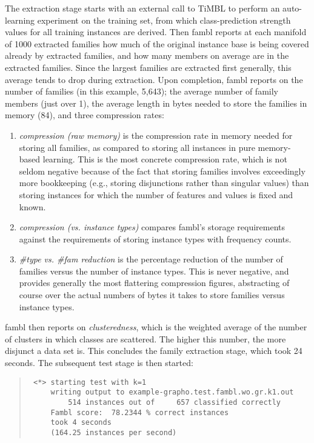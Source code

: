 \documentclass[11pt]{article}
\begin{document}
The extraction stage starts with an external call to TiMBL to perform
an auto-learning experiment on the training set, from which
class-prediction strength values for all training instances are
derived. Then {\sc fambl} reports at each manifold of 1000 extracted
families how much of the original instance base is being covered
already by extracted families, and how many members on average are in
the extracted families. Since the largest families are extracted first
generally, this average tends to drop during extraction. Upon
completion, {\sc fambl} reports on the number of families (in this
example, 5,643); the average number of family members (just over 1),
the average length in bytes needed to store the families in memory
(84), and three compression rates:
\begin{enumerate}
\item
{\em compression (raw memory)} is the compression rate in memory
needed for storing all families, as compared to storing all instances
in pure memory-based learning. This is the most concrete compression
rate, which is not seldom negative because of the fact that storing
families involves exceedingly more bookkeeping (e.g., storing
disjunctions rather than singular values) than storing instances for
which the number of features and values is fixed and known.
\item
{\em compression (vs. instance types)} compares {\sc fambl}'s storage
requirements against the requirements of storing instance types with
frequency counts.
\item
{\em \#type vs. \#fam reduction} is the percentage reduction of the
number of families versus the number of instance types. This is never
negative, and provides generally the most flattering compression
figures, abstracting of course over the actual numbers of bytes it
takes to store families versus instance types.
\end{enumerate}
{\sc fambl} then reports on {\em clusteredness}, which is the weighted
average of the number of clusters in which classes are scattered. The
higher this number, the more disjunct a data set is. This concludes
the family extraction stage, which took 24 seconds. The subsequent test
stage is then started:

\begin{quote}
{\tiny
\begin{verbatim}
 <*> starting test with k=1
     writing output to example-grapho.test.fambl.wo.gr.k1.out
         514 instances out of     657 classified correctly
     Fambl score:  78.2344 % correct instances
     took 4 seconds
     (164.25 instances per second)
\end{verbatim}
}
\end{quote}
\end{document}
